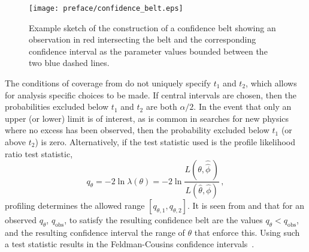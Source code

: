 \begin{figure}[htbp]
 \centering
 \texttt{[image: preface/confidence\_belt.eps]}
 \caption[Neyman construction of a confidence interval using a confidence belt.]{%
  Example sketch of the construction of a confidence belt showing an observation in red intersecting the belt and the corresponding confidence interval as the parameter values bounded between the two blue dashed lines.}\label{fig:confidence_belt}
\end{figure}

The conditions of coverage from  do not uniquely specify $t_{1}$ and $t_{2}$, which allows for analysis specific choices to be made.
If central intervals are chosen, then the probabilities excluded below $t_{1}$ and $t_{2}$ are both $\alpha/2$.
In the event that only an upper (or lower) limit is of interest, as is common in searches for new physics where no excess has been observed, then the probability excluded below $t_{1}$ (or above $t_{2}$) is zero.
Alternatively, if the test statistic used is the profile likelihood ratio test statistic,
\[
 q_{\theta} = -2 \ln\lambda\left(\theta\right) = -2 \ln\frac{L\left(\theta, \hat{\hat{\phi}}\,\right)}{L\left(\hat{\theta},\hat{\phi}\right)}\,,
\]
profiling determines the allowed range $\left[q_{\theta, 1}, q_{\theta, 2}\right]$.
It is seen from  and  that for an observed $q_{\theta}$, $q_{\mathrm{obs}}$, to satisfy  the resulting confidence belt are the values $q_{\theta} < q_{\mathrm{obs}}$, and the resulting confidence interval the range of $\theta$ that enforce this.
Using such a test statistic results in the Feldman-Cousins confidence intervals~\cite{Feldman:1997qc}.

